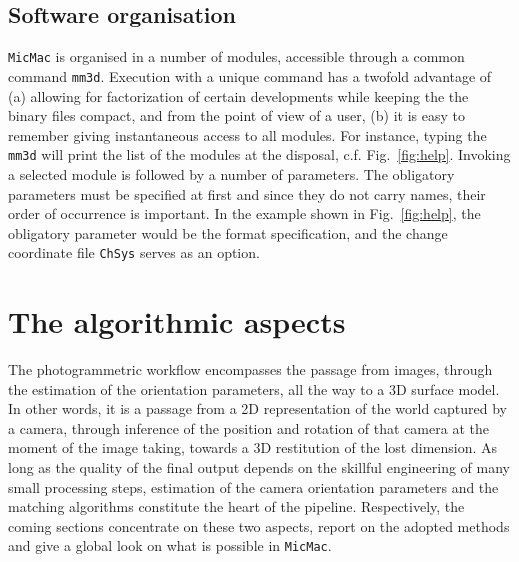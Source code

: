 \documentclass[twocolumn]{bmcart}%
\begin{document}
\subsection*{Software organisation}
{\tt MicMac} is organised in a number of modules, accessible through a common command {\tt mm3d}. Execution with a unique command has a twofold advantage of (a) allowing for factorization of certain developments while keeping the the binary files compact, and from the point of view of a user, (b) it is easy to remember giving instantaneous access to all modules. For instance, typing the {\tt mm3d} will print the list of the modules at the disposal, c.f. Fig.~\ref{fig:help}.
%
Invoking a selected module is followed by a number of parameters. The obligatory parameters must be specified at first and since they do not carry names, their order of occurrence is important. In the example shown in Fig.~\ref{fig:help}, the obligatory parameter would be the format specification, and the change coordinate file {\tt ChSys} serves as an option.


\section*{The algorithmic aspects}
The photogrammetric workflow encompasses the passage from images, through the estimation of the orientation parameters, all the way to a 3D surface model. In other words, it is a passage from a 2D representation of the world captured by a camera, through inference of the position and rotation of that camera at the moment of the image taking, towards a 3D restitution of the lost dimension. As long as the quality of the final output depends on the skillful engineering of many small processing steps, estimation of the camera orientation parameters and the matching algorithms constitute the heart of the pipeline. Respectively, the coming sections concentrate on these two aspects, report on the adopted methods and give a global look on what is possible in {\tt MicMac}.

 
\end{document}
